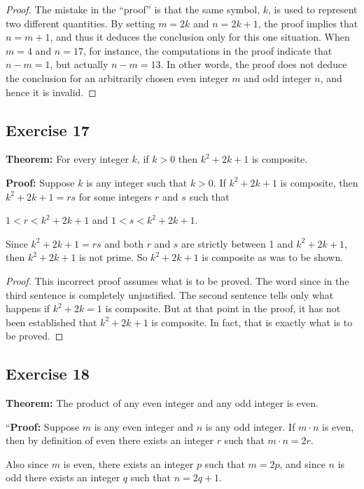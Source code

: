 \documentclass[14pt]{extarticle}
\begin{document}
\begin{proof}
The mistake in the “proof” is that the same symbol, $k$, is used to represent two different quantities. By setting $m = 2k$ and $n = 2k + 1$, the proof implies that $n = m + 1$, and thus it deduces the conclusion only for this one situation. When $m = 4$ and $n = 17$, for instance, the computations in the proof indicate that $n - m = 1$, but actually $n - m = 13$. In other words, the proof does not deduce the conclusion for an arbitrarily chosen even integer $m$ and odd integer $n$, and hence it is invalid.
\end{proof}

\subsection{Exercise 17}
{\bf Theorem:} For every integer $k$, if $k > 0$ then $k^2 + 2k + 1$ is composite.

{\bf Proof:} Suppose $k$ is any integer such that $k > 0$. If $k^2 + 2k + 1$ is composite, then $k^2 + 2k + 1 = rs$
for some integers $r$ and $s$ such that 

$1 < r < k^2 + 2k + 1$ and $1 < s < k^2 + 2k + 1$.

Since $k^2 + 2k + 1 = rs$ and both $r$ and $s$ are strictly between 1 and $k^2 + 2k + 1$, then $k^2 + 2k + 1$ is not prime. So $k^2 + 2k + 1$ is composite as was to be shown.

\begin{proof}
This incorrect proof assumes what is to be proved. The word since in the third sentence is completely unjustified. The second sentence tells only what happens if $k^2 + 2k = 1$ is composite. But at that point in the proof, it has not been established that $k^2 + 2k + 1$ is composite. In fact, that is exactly what is to be proved.
\end{proof}

\subsection{Exercise 18}
{\bf Theorem:} The product of any even integer and any odd integer is even.

“{\bf Proof:} Suppose $m$ is any even integer and $n$ is any odd integer. If $m\cdot n$ is even, then by definition of even there exists an integer $r$ such that $m\cdot n = 2r$. 

Also since $m$ is even, there exists an integer $p$ such that $m = 2p$, and since $n$ is odd there exists an integer $q$ such that $n = 2q + 1$. 
\end{document}
